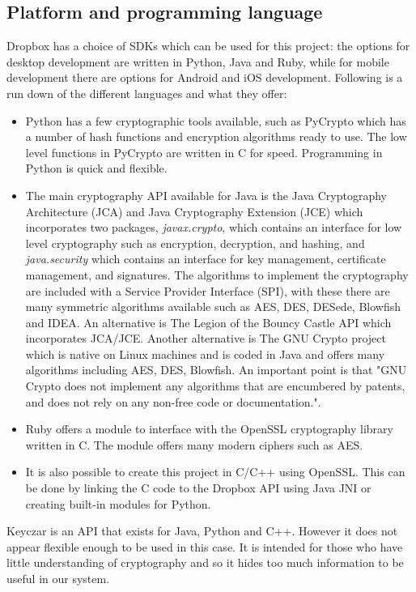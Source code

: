 \documentclass[12pt, titlepage]{article}
\begin{document}
\subsection*{Platform and programming language}
Dropbox has a choice of SDKs which can be used for this project: the options for desktop development are written in Python, Java and Ruby, while for mobile development there are options for Android and iOS development.
\newline Following is a run down of the different languages and what they offer:
\begin{itemize}
\item Python has a few cryptographic tools available, such as PyCrypto which has a number of hash functions and encryption algorithms ready to use. The low level functions in PyCrypto are written in C for speed.\cite{pyCrypto} Programming in Python is quick and flexible.
\item The main cryptography API available for Java is the Java Cryptography Architecture (JCA) and Java Cryptography Extension (JCE) which incorporates two packages, \textit{javax.crypto}, which contains an interface for low level cryptography such as encryption, decryption, and hashing, and \textit{java.security} which contains an interface for key management, certificate management, and signatures. The algorithms to implement the cryptography are included with a Service Provider Interface (SPI), with these there are many symmetric algorithms available such as AES, DES, DESede, Blowfish and IDEA\cite{javaJCA}. An alternative is The Legion of the Bouncy Castle API which incorporates JCA/JCE\cite{bouncyCastle}. Another alternative is The GNU Crypto project which is native on Linux machines and is coded in Java and offers many algorithms including AES, DES, Blowfish. An important point is that "GNU Crypto does not implement any algorithms that are encumbered by patents, and does not rely on any non-free code or documentation."\cite{gnuCrypto}.
\item Ruby offers a module to interface with the OpenSSL cryptography library written in C. The module offers many modern ciphers such as AES.\cite{rubyOpenSSL}
\item It is also possible to create this project in C/C++ using OpenSSL. This can be done by linking the C code to the Dropbox API using Java JNI or creating built-in modules for Python.
\end{itemize}
Keyczar is an API that exists for Java, Python and C++.\cite{keyczar} However it does not appear flexible enough to be used in this case. It is intended for those who have little understanding of cryptography and so it hides too much information to be useful in our system.
\end{document}
